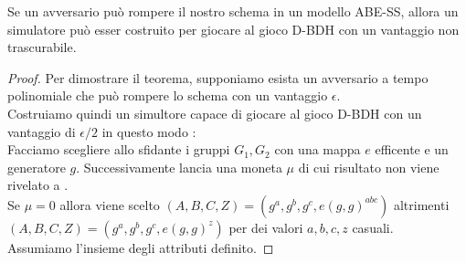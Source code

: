 \begin{thm}
Se un avversario può rompere il nostro schema in un modello ABE-SS, allora un simulatore può esser costruito per giocare al gioco D-BDH con un vantaggio non trascurabile.
\begin{proof}
Per dimostrare il teorema, supponiamo esista un avversario  a tempo polinomiale che può rompere lo schema con un vantaggio $\epsilon$.\\
Costruiamo quindi un simultore  capace di giocare al gioco D-BDH con un vantaggio di $\epsilon / 2$ in questo modo :\\
Facciamo scegliere allo sfidante i gruppi $G_1, G_2$ con una mappa $e$ efficente e un generatore $g$. Successivamente lancia una moneta $\mu$ di cui risultato non viene rivelato a .\\
Se $ \mu = 0$ allora viene scelto $(A,B,C,Z) = (g^a,g^b,g^c,e(g,g)^{abc})$ altrimenti $(A,B,C,Z) = (g^a,g^b,g^c, e(g,g)^z)$ per dei valori $a,b,c,z$ casuali.\\
Assumiamo l'insieme degli attributi  definito.


\end{proof}
\end{thm}
